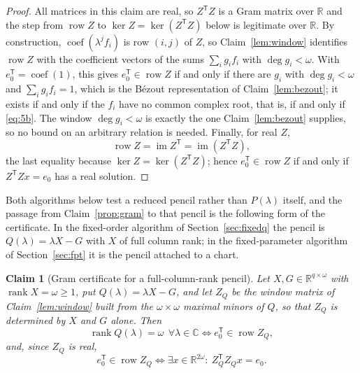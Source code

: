 \documentclass[journal]{IEEEtran}
\theoremstyle{plainn}
\newtheorem{claim}{Claim}
\theoremstyle{remark}
\begin{document}
\begin{proof}
All matrices in this claim are real, so $Z^{\mathsf T}Z$ is a Gram matrix over $\mathbb R$ and the step
from $\operatorname{row}Z$ to $\ker Z=\ker(Z^{\mathsf T}Z)$ below is legitimate over $\mathbb R$. By
construction, $\operatorname{coef}(\lambda^jf_i)$ is row $(i,j)$ of $Z$, so
Claim~\ref{lem:window} identifies $\operatorname{row}Z$ with the coefficient vectors of the sums
$\sum_i g_if_i$ with $\deg g_i<\omega$. With $e_0^{\mathsf T}=\operatorname{coef}(1)$, this gives
$e_0^{\mathsf T}\in\operatorname{row}Z$ if and only if there are $g_i$ with $\deg g_i<\omega$ and
$\sum_i g_if_i=1$, which is the B\'ezout representation of Claim~\ref{lem:bezout}; it exists if
and only if the $f_i$ have no common complex root, that is, if and only if \eqref{eq:5b}. The
window $\deg g_i<\omega$ is exactly the one Claim~\ref{lem:bezout} supplies, so no bound on an
arbitrary relation is needed. Finally, for real $Z$,
\begin{equation*}
\operatorname{row}Z=\operatorname{im}Z^{\mathsf T}
=\operatorname{im}(Z^{\mathsf T}Z),
\end{equation*}
the last equality because $\ker Z=\ker(Z^{\mathsf T}Z)$; hence
$e_0^{\mathsf T}\in\operatorname{row}Z$ if and only if
$Z^{\mathsf T}Zx=e_0$ has a real solution.
\end{proof}

Both algorithms below test a reduced pencil rather than $P(\lambda)$ itself, and the passage from
Claim~\ref{prop:gram} to that pencil is the following form of the certificate. In the fixed-order
algorithm of Section~\ref{sec:fixedq} the pencil is $Q(\lambda)=\lambda X-G$ with $X$ of full column
rank; in the fixed-parameter algorithm of Section~\ref{sec:fpt} it is the pencil attached to a chart.

\begin{claim}[Gram certificate for a full-column-rank pencil]\label{clm:gramQ}
Let $X,G\in\mathbb R^{q\times\omega}$ with $\operatorname{rank}X=\omega\ge1$, put
$Q(\lambda)=\lambda X-G$, and let $Z_Q$ be the window matrix of Claim~\ref{lem:window} built from the
$\omega\times\omega$ maximal minors of $Q$, so that $Z_Q$ is determined by $X$ and $G$ alone. Then
\begin{equation}
\operatorname{rank}Q(\lambda)=\omega\ \ \forall\lambda\in\mathbb C
\iff e_0^{\mathsf T}\in\operatorname{row}Z_Q ,
\end{equation}
and, since $Z_Q$ is real,
\begin{equation}
e_0^{\mathsf T}\in\operatorname{row}Z_Q
\iff\exists x\in\mathbb R^{2\omega}:\ Z_Q^{\mathsf T}Z_Qx=e_0 .
\end{equation}
\end{claim}
\end{document}
